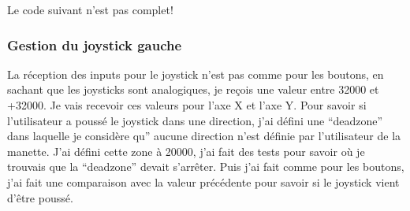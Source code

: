 \documentclass[a4paper,12pt,french]{sphinxmanual}
\begin{document}
\sphinxAtStartPar
Le code suivant n’est pas complet!

\begin{sphinxVerbatim}[commandchars=\\\{\}]
     

             \PYG{p}{[}\PYG{p}{]}
                   \PYG{p}{[}\PYG{p}{]}
                   \PYG{p}{[}\PYG{p}{]}
                   \PYG{p}{[}\PYG{p}{]}
\end{sphinxVerbatim}

\begin{sphinxVerbatim}[commandchars=\\\{\}]
       
\end{sphinxVerbatim}


\subsubsection{Gestion du joystick gauche}
\label{\detokenize{organique:gestion-du-joystick-gauche}}
\sphinxAtStartPar
La réception des inputs pour le joystick n’est pas comme pour les boutons, en sachant que les joysticks sont analogiques, je reçois une valeur entre \sphinxhyphen{}32000 et +32000. Je vais recevoir ces valeurs pour l’axe X et l’axe Y. Pour savoir si l’utilisateur a poussé le joystick dans une direction, j’ai défini une “deadzone” dans laquelle je considère qu” aucune direction n’est définie par l’utilisateur de la manette. J’ai défini cette zone à 20000, j’ai fait des tests pour savoir où je trouvais que la “deadzone” devait s’arrêter. Puis j’ai fait comme pour les boutons,  j’ai fait une comparaison avec la valeur précédente pour savoir si le joystick vient d’être poussé.
\end{document}
